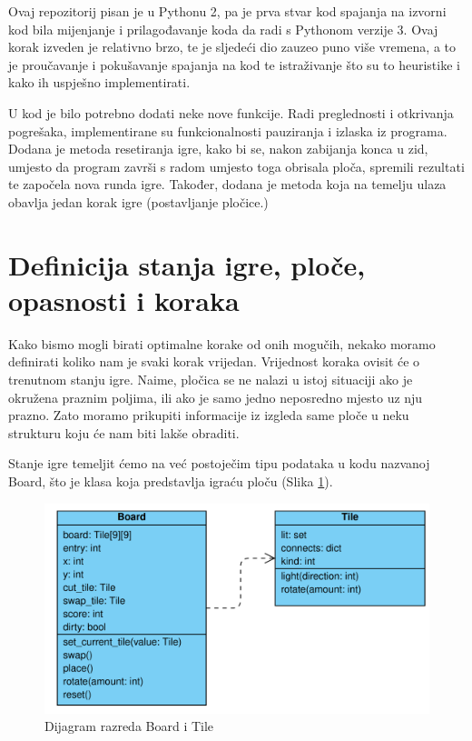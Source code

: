\documentclass[zavrsnirad]{fer}
\begin{document}
Ovaj repozitorij pisan je u Pythonu 2, pa je prva stvar kod spajanja na izvorni kod bila mijenjanje i prilagođavanje koda da radi s Pythonom verzije 3. Ovaj korak izveden je relativno brzo, te je sljedeći dio zauzeo puno više vremena, a to je proučavanje i pokušavanje spajanja na kod te istraživanje što su to heuristike i kako ih uspješno implementirati. 

U kod je bilo potrebno dodati neke nove funkcije. Radi preglednosti i otkrivanja pogrešaka, implementirane su funkcionalnosti pauziranja i izlaska iz programa. Dodana je metoda resetiranja igre, kako bi se, nakon zabijanja konca u zid, umjesto da program završi s radom umjesto toga obrisala ploča, spremili rezultati te započela nova runda igre. Također, dodana je metoda koja na temelju ulaza obavlja jedan korak igre (postavljanje pločice.)



\section{Definicija stanja igre, ploče, opasnosti i koraka}
\label{pog:definicija_stanja}

Kako bismo mogli birati optimalne korake od onih mogučih, nekako moramo definirati koliko nam je svaki korak vrijedan. Vrijednost koraka ovisit će o trenutnom stanju igre. Naime, pločica se ne nalazi u istoj situaciji ako je okružena praznim poljima, ili ako je samo jedno neposredno mjesto uz nju prazno. Zato moramo prikupiti informacije iz izgleda same ploče u neku strukturu koju će nam biti lakše obraditi.

Stanje igre temeljit ćemo na već postoječim tipu podataka u kodu nazvanoj Board, što je klasa koja predstavlja igraću ploču (Slika \ref{slk:class_diagram}).

\begin{figure}[htb]
	\centering
	\includegraphics[width=0.68\linewidth]{Figures/board_diagram.png} 
	\caption{Dijagram razreda Board i Tile}
	\label{slk:class_diagram}
\end{figure}
 
\end{document}
